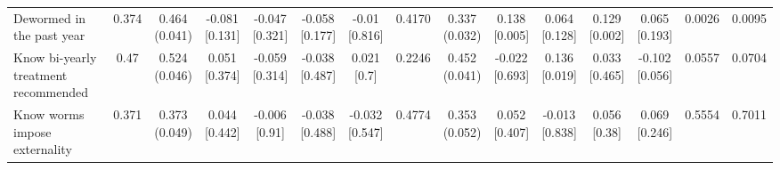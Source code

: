 {\begin{tabular}[t]{lcccccccccccccc}
\hspace{1em}Dewormed in the past year & 0.374 & \makecell[c]{0.464\\(0.041)} & \makecell[c]{-0.081\\{[0.131]}} & \makecell[c]{-0.047\\{[0.321]}} & \makecell[c]{-0.058\\{[0.177]}} & \makecell[c]{-0.01\\{[0.816]}} & 0.4170 & \makecell[c]{0.337\\(0.032)} & \makecell[c]{0.138\\{[0.005]}} & \makecell[c]{0.064\\{[0.128]}} & \makecell[c]{0.129\\{[0.002]}} & \makecell[c]{0.065\\{[0.193]}} & 0.0026 & 0.0095\\
\hspace{1em}Know bi-yearly treatment recommended & 0.47 & \makecell[c]{0.524\\(0.046)} & \makecell[c]{0.051\\{[0.374]}} & \makecell[c]{-0.059\\{[0.314]}} & \makecell[c]{-0.038\\{[0.487]}} & \makecell[c]{0.021\\{[0.7]}} & 0.2246 & \makecell[c]{0.452\\(0.041)} & \makecell[c]{-0.022\\{[0.693]}} & \makecell[c]{0.136\\{[0.019]}} & \makecell[c]{0.033\\{[0.465]}} & \makecell[c]{-0.102\\{[0.056]}} & 0.0557 & 0.0704\\
\hspace{1em}Know worms impose externality & 0.371 & \makecell[c]{0.373\\(0.049)} & \makecell[c]{0.044\\{[0.442]}} & \makecell[c]{-0.006\\{[0.91]}} & \makecell[c]{-0.038\\{[0.488]}} & \makecell[c]{-0.032\\{[0.547]}} & 0.4774 & \makecell[c]{0.353\\(0.052)} & \makecell[c]{0.052\\{[0.407]}} & \makecell[c]{-0.013\\{[0.838]}} & \makecell[c]{0.056\\{[0.38]}} & \makecell[c]{0.069\\{[0.246]}} & 0.5554 & 0.7011\\

\end{tabular}}

